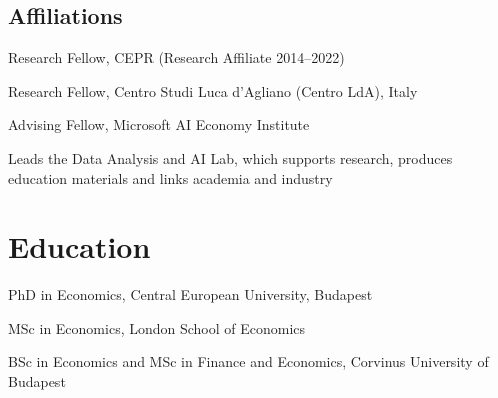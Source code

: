 \documentclass[10pt,a4paper]{article}
\begin{document}
\subsection{Affiliations}
\begin{cvlist}
  \item[2022--] Research Fellow, CEPR (Research Affiliate 2014--2022)
  \item[] Research Fellow, Centro Studi Luca d'Agliano (Centro LdA), Italy
  \item[2025--] Advising Fellow, Microsoft AI Economy Institute
  \item[] Leads the Data Analysis and AI Lab, which supports research, produces education materials and links academia and industry
\end{cvlist}

\section{Education}
\begin{cvlist}
  \item[2007] PhD in Economics, Central European University, Budapest
  \item[2000] MSc in Economics, London School of Economics
  \item[1999] BSc in Economics and MSc in Finance and Economics, Corvinus University of Budapest
\end{cvlist}

\end{document}
